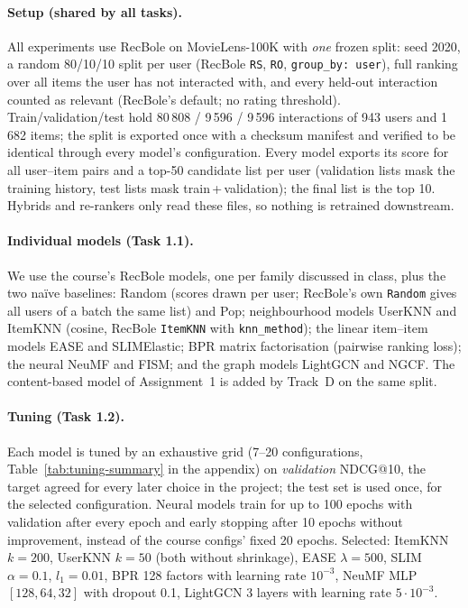 \documentclass[12pt,a4paper]{article}
\begin{document}
\paragraph{Setup (shared by all tasks).}
All experiments use RecBole on MovieLens-100K with \emph{one} frozen split: seed 2020, a random
80/10/10 split per user (RecBole \texttt{RS}, \texttt{RO}, \texttt{group\_by: user}), full ranking over all
items the user has not interacted with, and every held-out interaction counted as relevant (RecBole's default; no
rating threshold). Train/validation/test hold 80\,808 / 9\,596 / 9\,596 interactions of 943 users and 1\,682
items; the split is exported once with a checksum manifest and verified to be identical through every model's
configuration. Every model exports its score for all user--item pairs and a top-50 candidate list per user
(validation lists mask the training history, test lists mask train\,+\,validation); the final list is the top 10.
Hybrids and re-rankers only read these files, so nothing is retrained downstream.

\paragraph{Individual models (Task 1.1).}
We use the course's RecBole models, one per family discussed in class, plus the two na\"ive baselines: Random
(scores drawn per user; RecBole's own \texttt{Random} gives all users of a batch the same list) and Pop;
neighbourhood models UserKNN and ItemKNN (cosine, RecBole \texttt{ItemKNN} with \texttt{knn\_method});
the linear item--item models EASE and SLIMElastic; BPR matrix factorisation (pairwise ranking loss);
the neural NeuMF and FISM; and the graph models LightGCN and NGCF. The content-based model of
Assignment~1 is added by Track~D on the same split.

\paragraph{Tuning (Task 1.2).}
Each model is tuned by an exhaustive grid (7--20 configurations, Table~\ref{tab:tuning-summary} in the appendix)
on \emph{validation} NDCG@10, the target agreed for every later choice in the project; the test set is used
once, for the selected configuration. Neural models train for up to 100 epochs with validation after every
epoch and early stopping after 10 epochs without improvement, instead of the course configs' fixed 20 epochs.
Selected: ItemKNN $k{=}200$, UserKNN $k{=}50$ (both without shrinkage), EASE $\lambda{=}500$, SLIM
$\alpha{=}0.1$, $l_1{=}0.01$, BPR 128 factors with learning rate $10^{-3}$, NeuMF MLP $[128,64,32]$ with
dropout 0.1, LightGCN 3 layers with learning rate $5\cdot10^{-3}$.
\end{document}
